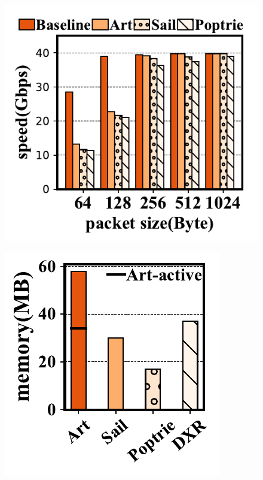 \documentclass[a4paper]{article}
\begin{document}
    \begin{figure}[htbp]
        \includegraphics{../result/example-pdf/example6.pdf}
    \end{figure}

    \begin{figure}[htbp]
        \includegraphics{../result/example-pdf/example7.pdf}
    \end{figure}
\end{document}
